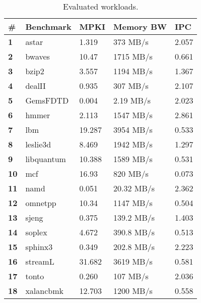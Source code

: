 \begin{table}[!tb] 
\centering
\caption{Evaluated workloads.}
\label{Table:Workloads}
\begin{tabular}{p{0.7cm} p{1.5cm} p{1cm} p{1.7cm} p{1cm} }
\hline
{\bf \#} & \bf Benchmark & MPKI & Memory BW & IPC  \\
\hline 
{\bf 1} & astar & 1.319 & 373 MB/s & 2.057 \\
{\bf 2} & bwaves & 10.47 & 1715 MB/s & 0.661 \\
{\bf 3} & bzip2 & 3.557 & 1194 MB/s & 1.367 \\ 
{\bf 4} & dealII &  0.935 & 307 MB/s & 2.107 \\
{\bf 5} & GemsFDTD & 0.004 & 2.19 MB/s & 2.023 \\
{\bf 6} & hmmer & 2.113 & 1547 MB/s & 2.861 \\
{\bf 7} & lbm & 19.287 & 3954 MB/s & 0.533 \\
{\bf 8} & leslie3d & 8.469 & 1942 MB/s & 1.297 \\
{\bf 9} & libquantum & 10.388 & 1589 MB/s & 0.531 \\
{\bf 10} & mcf & 16.93 & 820 MB/s & 0.073 \\
{\bf 11} & namd & 0.051 & 20.32 MB/s & 2.362\\
{\bf 12} & omnetpp & 10.34 & 1147 MB/s & 0.504 \\
{\bf 13} & sjeng & 0.375 & 139.2 MB/s & 1.403 \\
{\bf 14} & soplex & 4.672 & 390.8 MB/s & 0.513 \\
{\bf 15} & sphinx3 & 0.349 & 202.8 MB/s & 2.223 \\
{\bf 16} & streamL & 31.682 & 3619 MB/s & 0.581 \\
{\bf 17} & tonto & 0.260 & 107 MB/s & 2.036 \\
{\bf 18} & xalancbmk & 12.703 & 1200 MB/s & 0.558 \\
\hline
\end{tabular}
\end{table}
\begin{comment}
Assume $n$ different applications denoted by ${U1, U2, .. Un}$ with different cache benefits which may affect each other with different cost functions. Figure 1 shows the different applications which are the vertices of the graph with their impact on each other which are the weights of edges in the graph. If two vertices are not connected in the graph, it means that they would not affect each others' performance. For example, one application is CPU bound and does not benefit from larger memory bandwith and the other is memory bound and does not benefit from having more CPU capacity. So different applications affect each other's performance with different coefficients. 
\end{comment}
